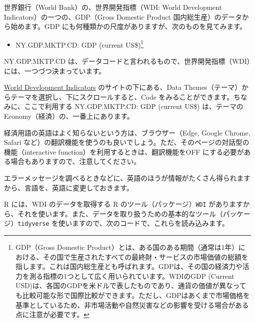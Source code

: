 \documentclass[
  xelatex, ja=standard]{bxjsbook}
\providecommand{\tightlist}{%
  \setlength{\itemsep}{0pt}\setlength{\parskip}{0pt}}
\theoremstyle{definition}
\theoremstyle{definition}
\theoremstyle{definition}
\theoremstyle{definition}
\theoremstyle{remark}
\begin{document}
世界銀行（World Bank）の、世界開発指標（WDI: World Development Indicators）の一つの、GDP（Gross Domestic Product 国内総生産）のデータから始めます。GDP にも何種類かの尺度がありますが、次のものを見てみます。

\begin{itemize}
\tightlist
\item
  NY.GDP.MKTP.CD: GDP (current US\$)\footnote{GDP（Gross Domestic Product）とは、ある国のある期間（通常は1年）における、その国で生産されたすべての最終財・サービスの市場価値の総額を指します。これは国内総生産とも呼ばれます。GDPは、その国の経済力や活力を測る指標の1つとして広く用いられています。WDIのGDP (Current USD)は、各国のGDPを米ドルで表したものであり、通貨の価値が異なっても比較可能な形で国際比較ができます。ただし、GDPはあくまで市場価格を基準としているため、非市場活動や自然災害などの影響を受ける場合がある点に注意が必要です。}
\end{itemize}

NY.GDP.MKTP.CD は、データコードと言われるもので、世界開発指標（WDI）には、一つづつ決まっています。

\href{https://datatopics.worldbank.org/world-development-indicators/}{World Development Indicators} のサイトの下にある、Data Themes（テーマ）からテーマを選択し、下にスクロールすると、Code をみることができます。ちなみに、ここで利用する NY.GDP.MKTP.CD: GDP (current US\$) は、テーマの Economy（経済）の、一番上にあります。

経済用語の英語はよく知らないという方は、ブラウザー（Edge, Google Chrome, Safari など）の翻訳機能を使うのも良いでしょう。ただ、そのページの対話型の機能（interactive function）を利用するときは、翻訳機能をOFF にする必要がある場合もありますので、注意してください。

エラーメッセージを調べるときなどに、英語のほうが情報がたくさん得られますから、言語を、英語に変更しておきます。

R には、WDI のデータを取得する R のツール（パッケージ）\texttt{WDI} がありますから、それを使います。また、データを取り扱うための基本的なツール（パッケージ）\texttt{tidyverse} を使いますので、次のコードで、これらを読み込みます。
\end{document}
